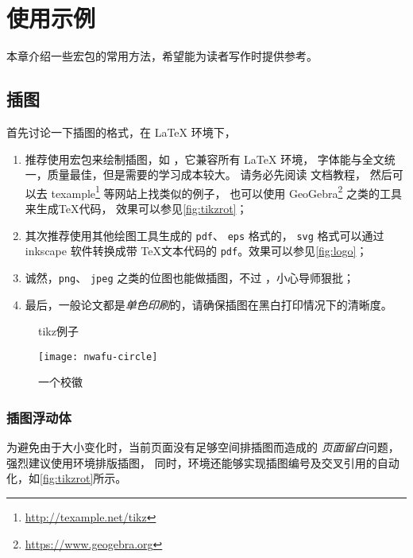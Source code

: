 
\chapter{使用示例}

本章介绍一些宏包的常用方法，希望能为读者写作时提供参考。

\section{插图}

首先讨论一下插图的格式，在 \LaTeX{} 环境下，
\begin{enumerate}
\item 推荐使用宏包来绘制插图，如 ，它兼容所有 \LaTeX{} 环境，
字体能与全文统一，质量最佳，但是需要的学习成本较大。
请务必先阅读  文档教程，
然后可以去 texample\footnote{\url{http://texample.net/tikz}} 等网站上找类似的例子，
也可以使用 GeoGebra\footnote{\url{https://www.geogebra.org}} 之类的工具来生成\TeX 代码，
效果可以参见\autoref{fig:tikzrot}；
\item 其次推荐使用其他绘图工具生成的 \verb|pdf|、 \verb|eps| 格式的，
\verb|svg| 格式可以通过 inkscape 软件转换成带 \TeX{}文本代码的 \verb|pdf|。效果可以参见\autoref{fig:logo}；
\item 诚然，\verb|png|、 \verb|jpeg| 之类的位图也能做插图，不过
  ，小心导师狠批；
\item 最后，一般论文都是\emph{单色印刷}的，请确保插图在黑白打印情况下的清晰度。
\end{enumerate}

\begin{figure}[htb]
  \setcounter{density}{20}
  
  \caption{tikz例子}
  \label{fig:tikzrot}
\end{figure}

\begin{figure}[htb]
  \texttt{[image: nwafu-circle]}
  \caption{一个校徽}
  \label{fig:logo}
\end{figure}

\subsection{插图浮动体}

为避免由于大小变化时，当前页面没有足够空间排插图而造成的
\emph{页面留白}问题，强烈建议使用环境排版插图，
同时，环境还能够实现插图编号及交叉引用的自动化，如\autoref{fig:tikzrot}所示。

